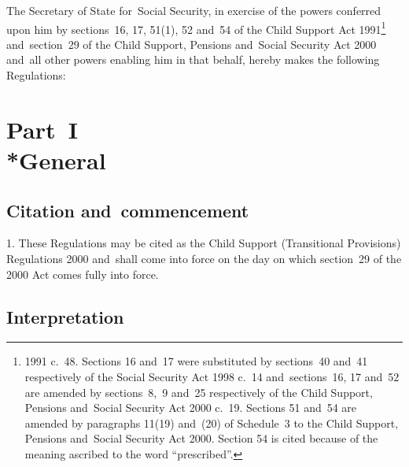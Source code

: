 \documentclass[12pt,a4paper]{article}
\title{\regstitle}
\author{S.I. 2000 No.~3186}
\date{Made 4th December 2000\\Laid before Parliament 6th December 2000\\Coming into force as provided in regulation~1(1)}
\begin{document}
\maketitle

\enlargethispage{\baselineskip}

\noindent
The Secretary of State for~Social Security, in exercise of the powers conferred upon him by sections~16, 17, 51(1), 52 and~54 of the Child Support Act 1991\footnote{1991 c.\ 48. Sections 16 and~17 were substituted by sections~40 and~41 respectively of the Social Security Act 1998 c.\ 14 and~sections~16, 17 and~52 are amended by sections~8,~9 and~25 respectively of the Child Support, Pensions and~Social Security Act 2000 c.~19. Sections 51 and~54 are amended by paragraphs 11(19) and~(20) of Schedule~3 to the Child Support, Pensions and~Social Security Act 2000. Section 54 is cited because of the meaning ascribed to the word “prescribed”.} and~section~29 of the Child Support, Pensions and~Social Security Act 2000 and~all other powers enabling him in that behalf, hereby makes the following Regulations: 

{\sloppy

\tableofcontents

}

\bigskip

\setcounter{secnumdepth}{-2}

\pagebreak[3]

\section[Part~I --- General]{Part~I\\*General}

\renewcommand\parthead{--- Part~I}

\subsection[1. Citation and~commencement]{Citation and~commencement}

1.  These Regulations may be cited as the Child Support (Transitional Provisions) Regulations 2000 and~shall come into force on the day on which section~29 of the 2000 Act comes fully into force.

\subsection[2. Interpretation]{Interpretation}
\end{document}
